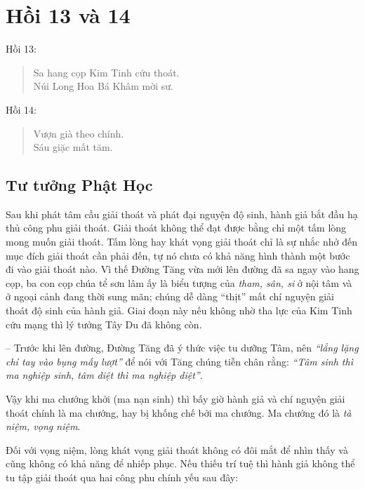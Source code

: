 \chapter{Hồi 13 và 14} %
\label{cha:hoi_13_14}

Hồi 13:

\begin{verse}
\begin{itshape}
Sa hang cọp Kim Tinh cứu thoát.\\
Núi Long Hoa Bá Khâm mời sư.
\end{itshape}
\end{verse}

Hồi 14:

\begin{verse}
\begin{itshape}
Vượn già theo chính.\\
Sáu giặc mất tăm.
\end{itshape}
\end{verse}

\section{Tư tưởng Phật Học} %
\label{sec:13_phat_hoc}

Sau khi phát tâm cầu giải thoát và phát đại nguyện độ sinh, hành giả bắt đầu hạ thủ công phu giải thoát. Giải thoát không thể đạt được bằng chỉ một tấm lòng mong muốn giải thoát. Tấm lòng hay khát vọng giải thoát chỉ là sự nhắc nhở đến mục đích giải thoát cần phải đến, tự nó chưa có khả năng hình thành một bước đi vào giải thoát nào. Vì thế Đường Tăng vừa mới lên đường đã sa ngay vào hang cọp, ba con cọp chúa tể sơn lâm ấy là biểu tượng của \emph{tham, sân, si} ở nội tâm và ở ngoại cảnh đang thời sung mãn; chúng dễ dàng ``thịt'' mất chí nguyện giải thoát độ sinh của hành giả. Giai đoạn này nếu không nhờ tha lực của Kim Tinh cứu mạng thì lý tưởng Tây Du đã không còn.

-- Trước khi lên đường, Đường Tăng đã ý thức việc tu dưỡng Tâm, nên \emph{``lẳng lặng chỉ tay vào bụng mấy lượt''} để nói với Tăng chúng tiễn chân rằng: \emph{``Tâm sinh thì ma nghiệp sinh, tâm diệt thì ma nghiệp diệt''}.

Vậy khi ma chướng khởi (ma nạn sinh) thì bấy giờ hành giả và chí nguyện giải thoát chính là ma chướng, hay bị khống chế bởi ma chướng. Ma chướng đó là \emph{tà niệm, vọng niệm}.

Đối với vọng niệm, lòng khát vọng giải thoát không có đôi mắt để nhìn thấy và cũng không có khả năng để nhiếp phục. Nếu thiếu trí tuệ thì hành giả không thể tu tập giải thoát qua hai công phu chính yếu sau đây:

